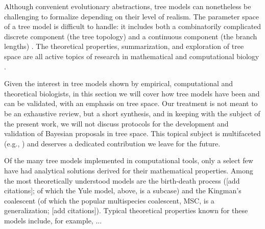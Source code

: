 \documentclass[oneside]{article}
\begin{document}
Although convenient evolutionary abstractions, tree models can nonetheless be challenging to formalize depending on their level of realism.
The parameter space of a tree model is difficult to handle: it includes both a combinatorily complicated discrete component (the tree topology) and a continuous component (the branch lengths) \citep{semple03}.
The theoretical properties, summarization, and exploration of tree space are all active topics of research in mathematical and computational biology \citep{gavryushkina13,gavryushkin16,brown20}.

Given the interest in tree models shown by empirical, computational and theoretical biologists, in this section we will cover how tree models have been and can be validated, with an emphasis on tree space.
Our treatment is not meant to be an exhaustive review, but a short synthesis, and in keeping with the subject of the present work, we will not discuss protocols for the development and validation of Bayesian proposals in tree space.
This topical subject is multifaceted (e.g., \citealp{douglas21,bouckaert22,douglas22}) and deserves a dedicated contribution we leave for the future.

Of the many tree models implemented in computational tools, only a select few have had analytical solutions derived for their mathematical properties.
Among the most theoretically understood models are the birth-death process ([add citations]; of which the Yule model, above, is a subcase) and the Kingman's coalescent (of which the popular multispecies coalescent, MSC, is a generalization; [add citations]).
Typical theoretical properties known for these models include, for
example, ...
\end{document}
